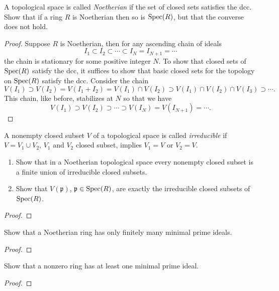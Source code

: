 \newpage
\begin{problem}
A topological space is called \emph{Noetherian} if the set of
closed sets satisfies the dcc. Show that if a ring $R$ is
Noetherian then so is $\operatorname{Spec}(R)$, but that the converse does not
hold.
\end{problem}
\begin{proof}
Suppose $R$ is Noetherian, then for any ascending chain of ideals
\[
I_1\subset I_2\subset\cdots\subset I_N=I_{N+1}=\cdots
\]
the chain is stationary for some positive integer $N$. To show
that closed sets of $\operatorname{Spec}(R)$ satisfy the dcc, it suffices to
show that basic closed sets for the topology on $\operatorname{Spec}(R)$
satisfy the dcc. Consider the chain
\[
V(I_1)\supset V(I_2)=V(I_1+I_2)=V(I_1)\cap V(I_2)\supset
V(I_1)\cap V(I_2)\cap V(I_3)\supset\cdots.
\]
This chain, like before, stabilizes at $N$ so that we have
\[
V(I_1)\supset V(I_2)\supset\cdots\supset V(I_N)=V(I_{N+1})=\cdots.
\]
\end{proof}
\newpage
\begin{problem}
A nonempty closed subset $V$ of a topological space is called
\emph{irreducible} if $V=V_1\cup V_2$, $V_1$ and $V_2$ closed
subset, implies $V_1=V$ or $V_2=V$.
\begin{enumerate}[noitemsep,label=(\alph*)]
\item Show that in a Noetherian topological space every nonempty
  closed subset is a finite union of irreducible closed subsets.
\item Show that $V(\mathfrak{p})$, $\mathfrak{p}\in\operatorname{Spec}(R)$, are
  exactly the irreducible closed subsets of $\operatorname{Spec}(R)$.
\end{enumerate}
\end{problem}
\begin{proof}
\end{proof}
\newpage
\begin{problem}
Show that a Noetherian ring has only finitely many minimal prime
ideals.
\end{problem}
\begin{proof}
\end{proof}
\newpage
\begin{problem}
Show that a nonzero ring has at least one minimal prime ideal.
\end{problem}
\begin{proof}
\end{proof}


